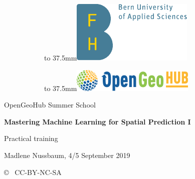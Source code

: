 \documentclass[11pt,a4paper,twoside]{article}\usepackage[]{graphicx}\usepackage[]{color}
\def\imagebox#1#2{\vtop to #1{\null\hbox{#2}\vfill}}
\begin{document}
\begin{figure}
\centering
\begin{subfigure}[t]{0.27\textwidth}
\imagebox{37.5mm}{\includegraphics[width=\textwidth]{figure/BFH-Logo.pdf}}
\end{subfigure}
\hfill
\begin{subfigure}[t]{0.3\textwidth}
\imagebox{37.5mm}{\includegraphics[width=\textwidth]{figure/logo-opengeohub.png}}
\end{subfigure}
\end{figure}

\vspace{5cm}
{\LARGE\textsf{OpenGeoHub Summer School}}

\vspace{0.7cm}
{\Large\textbf{\textsf{Mastering Machine Learning for Spatial Prediction I} }}

\vspace{0.3cm}

{\Large\textsf{Practical training}  }

\vspace{0.5cm}
\textsf{Madlene Nussbaum, 4/5 September 2019}

{ \small \textsf{\copyright~ CC-BY-NC-SA } 	} 
\bigskip


\setlength{\parskip}{0pt}
\tableofcontents
\thispagestyle{empty}
\setlength{\parskip}{4pt}

\end{document}

